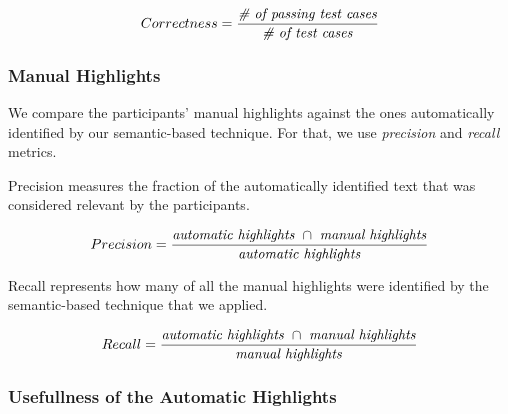 {\begin{small}
\begin{equation}
    Correctness = \frac{ \text{\textit{\# of passing test cases}}}{\text{\textit{\#  of test cases}}}
\end{equation}
\end{small}



\subsubsection{Manual Highlights}


We compare the participants' manual highlights  against the ones automatically identified by our semantic-based technique. 
For that, we use \textit{precision} and \textit{recall} metrics. 




Precision measures the fraction of the automatically identified text that was  considered relevant
by the participants.

\smallskip
\begin{small}


\begin{equation}
    Precision = \frac{
        \text{\textit{automatic highlights}~} \cap 
        \text{~\textit{manual highlights}}
    }{\text{\textit{automatic highlights}}}
\end{equation}
\end{small}


Recall represents how many of all the manual highlights were identified by the semantic-based technique that we applied.

\smallskip
\begin{small}

\begin{equation}
    Recall = \frac{
        \text{\textit{automatic highlights}~} \cap 
        \text{~\textit{manual highlights}}
    }{\text{\textit{manual highlights}}}
\end{equation}
\end{small}

\medskip
{}





\subsubsection{Usefullness of the Automatic Highlights}


}
